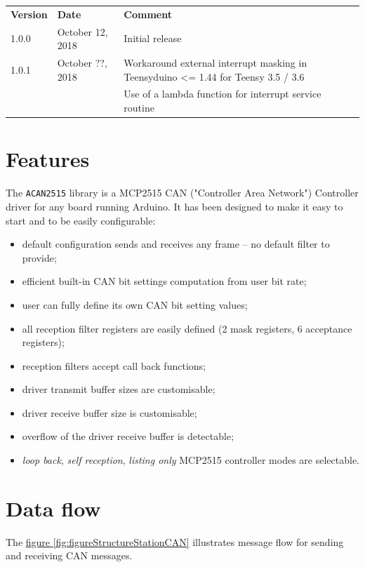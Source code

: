 \documentclass[10pt, a4paper, obeyspaces, openany]{extarticle}
\newcommand\refFigure[2]{\hyperref[fig:#2]{figure \ref*{fig:#2}{\ifthenelse{\equal{#1}{}}{}{.#1}}}}
\begin{document}
\begin{center}
  \begin{tabular}{llp{10cm}}
    \textbf{Version} & \textbf{Date} & \textbf{Comment}\\
    1.0.0 & October 12, 2018 & Initial release \\
    1.0.1 & October ??, 2018 & Workaround external interrupt masking in Teensyduino <= 1.44 for Teensy 3.5 / 3.6\\
          &          & Use of a lambda function for interrupt service routine
  \end{tabular}
\end{center}

\section{Features}

The \texttt{ACAN2515} library is a MCP2515 CAN ("Controller Area Network") Controller driver for any board running Arduino. It has been designed to make it easy to start and to be easily configurable:
\begin{itemize}
  \item default configuration sends and receives any frame -- no default filter to provide;
  \item efficient built-in CAN bit settings computation from user bit rate;
  \item user can fully define its own CAN bit setting values;
  \item all reception filter registers are easily defined (2 mask registers, 6 acceptance registers);
  \item reception filters accept call back functions;
  \item driver transmit buffer sizes are customisable;
  \item driver receive buffer size is customisable;
  \item overflow of the driver receive buffer is detectable;
  \item \emph{loop back}, \emph{self reception}, \emph{listing only} MCP2515 controller modes are selectable.
\end{itemize}



\section{Data flow}

The \refFigure{}{figureStructureStationCAN} illustrates message flow for sending and receiving CAN messages.
\end{document}
